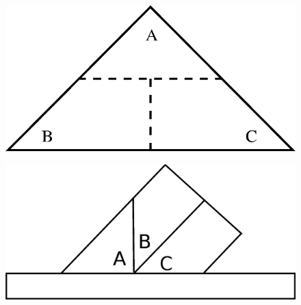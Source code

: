           \label{m39368*id317868}
    \setcounter{subfigure}{0}


	\begin{figure}[H] %
    \begin{center}
    \label{m39368*id317874!!!underscore!!!media}\label{m39368*id317874!!!underscore!!!printimage}\includegraphics{col11306.imgs/m39368_MG10C13_027.png} %
        
      \vspace{2pt}
    \vspace{.1in}
    
    \end{center}

 \end{figure}   

    \addtocounter{footnote}{-0}
    
    \setcounter{subfigure}{0}


	\begin{figure}[H] %
    \begin{center}
    \label{m39368*id317886!!!underscore!!!media}\label{m39368*id317886!!!underscore!!!printimage}\includegraphics{col11306.imgs/m39368_MG10C13_028.png} %
        
      \vspace{2pt}
    \vspace{.1in}
    
    \end{center}

 \end{figure}   

